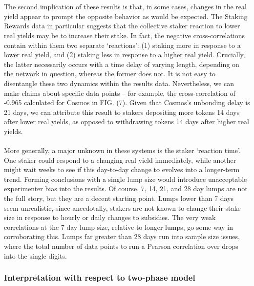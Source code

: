 \documentclass[longbibliography,nofootinbib]{revtex4-1}
\begin{document}
\\\\
The second implication of these results is that, in some cases, changes in the real yield appear to prompt the opposite behavior as would be expected. The Staking Rewards data in particular suggests that the collective staker reaction to lower real yields may be to increase their stake. In fact, the negative cross-correlations contain within them two separate `reactions': (1) staking more in response to a lower real yield, and (2) staking less in response to a higher real yield. Crucially, the latter necessarily occurs with a time delay of varying length, depending on the network in question, whereas the former does not. It is not easy to disentangle these two dynamics within the results data. Nevertheless, we can make claims about specific data points – for example, the cross-correlation of -0.965 calculated for Cosmos in FIG. (7). Given that Cosmos's unbonding delay is 21 days, we can attribute this result to stakers depositing more tokens 14 days after lower real yields, as opposed to withdrawing tokens 14 days after higher real yields.
\\\\
More generally, a major unknown in these systems is the staker `reaction time'. One staker could respond to a changing real yield immediately, while another might wait weeks to see if this day-to-day change to evolves into a longer-term trend. Forming conclusions with a single lump size would introduce unacceptable experimenter bias into the results. Of course, 7, 14, 21, and 28 day lumps are not the full story, but they are a decent starting point. Lumps lower than 7 days seem unrealistic, since anecdotally, stakers are not known to change their stake size in response to hourly or daily changes to subsidies. The very weak correlations at the 7 day lump size, relative to longer lumps, go some way in corroborating this. Lumps far greater than 28 days run into sample size issues, where the total number of data points to run a Pearson correlation over drops into the single digits.

\subsubsection{Interpretation with respect to two-phase model}
\end{document}

